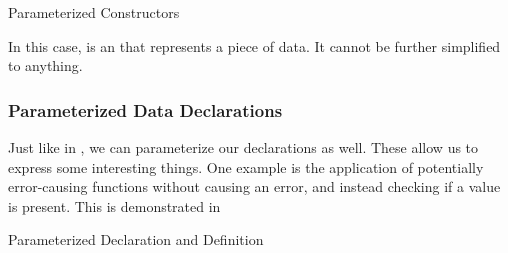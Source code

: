 \begin{listing}[h!tbp]
\caption{Parameterized Constructors}
\label{lst:Data_Declaration-Parameterized_Constructors}
\end{listing}

In this case,  is an  that represents a piece of data.
It cannot be further simplified to anything.

\subsubsection{Parameterized Data Declarations}\label{subsubsec:Parameterized_Data_Declarations}
Just like in , we can parameterize our  declarations as well.
These allow us to express some interesting things.
One example is the application of potentially error-causing functions without causing an error, and instead checking if a value is present.
This is demonstrated in 

\begin{listing}[h!tbp]
\caption{Parameterized  Declaration and Definition}
\label{lst:Data_Declaration-Parameterized}
\end{listing}

